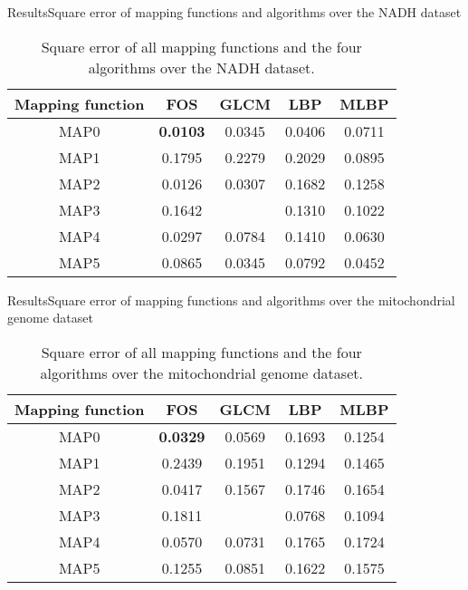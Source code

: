 \documentclass[10pt]{beamer}
\newcommand{\1}{
	\setbeamertemplate{background}{
		\texttt{[image: img/1\_dna]}
		\tikz[overlay] \fill[fill opacity=0.75,fill=white] (0,0) rectangle (-\paperwidth,\paperheight);
	}
}
\begin{document}
\begin{frame}{Results}{Square error of mapping functions and algorithms over the NADH dataset}
\begin{table}[hbt!]
	\centering
	\caption{Square error of all mapping functions and the four algorithms over the NADH dataset.}
	\label{tab:comparison_score_db2}
	\setlength{\tabcolsep}{0.5em} %
	{\renewcommand{\arraystretch}{1}%
		\begin{tabular}{ccccc}
			\hline
			Mapping function    & FOS  		& GLCM & LBP & MLBP \\ \hline
			MAP0 				&	\textbf{0.0103} &	0.0345 &	0.0406 	& 0.0711 
			\\
			MAP1 				& 	0.1795 &	0.2279 &	0.2029 &	0.0895 
			\\
			MAP2 				&	0.0126 &	0.0307 &	0.1682 &	0.1258 
			\\
			MAP3 				&	0.1642 &			& 	0.1310 &	0.1022 
			\\
			MAP4 				&	0.0297 &	0.0784 &	0.1410 &	0.0630 
			\\
			MAP5 				&	0.0865 &	0.0345 &	0.0792 &	0.0452 \\ \hline
		\end{tabular}
	}
\end{table}
\end{frame}

\begin{frame}{Results}{Square error of mapping functions and algorithms over the mitochondrial genome dataset}
\begin{table}[hbt!]
	\centering
	\caption{Square error of all mapping functions and the four algorithms over the mitochondrial genome dataset.}
	\label{tab:comparison_score_db3}
	\setlength{\tabcolsep}{0.5em} %
	{\renewcommand{\arraystretch}{1}%
		\begin{tabular}{ccccc}
			\hline
			Mapping function    & FOS  		& GLCM & LBP & MLBP \\ \hline
			MAP0 &	\textbf{0.0329} &	0.0569 &	0.1693 &	0.1254 
			\\
			MAP1 &	0.2439 &	0.1951 &	0.1294 &	0.1465 
			\\
			MAP2 &	0.0417 &	0.1567 &	0.1746 &	0.1654 
			\\
			MAP3 &	0.1811 & &		0.0768 &	0.1094 
			\\
			MAP4 &	0.0570 &	0.0731 &	0.1765 &	0.1724 
			\\
			MAP5 &	0.1255 &	0.0851 &	0.1622 & 	0.1575 
			\\ \hline
			
		\end{tabular}
	}
\end{table}
\end{frame}
\end{document}
